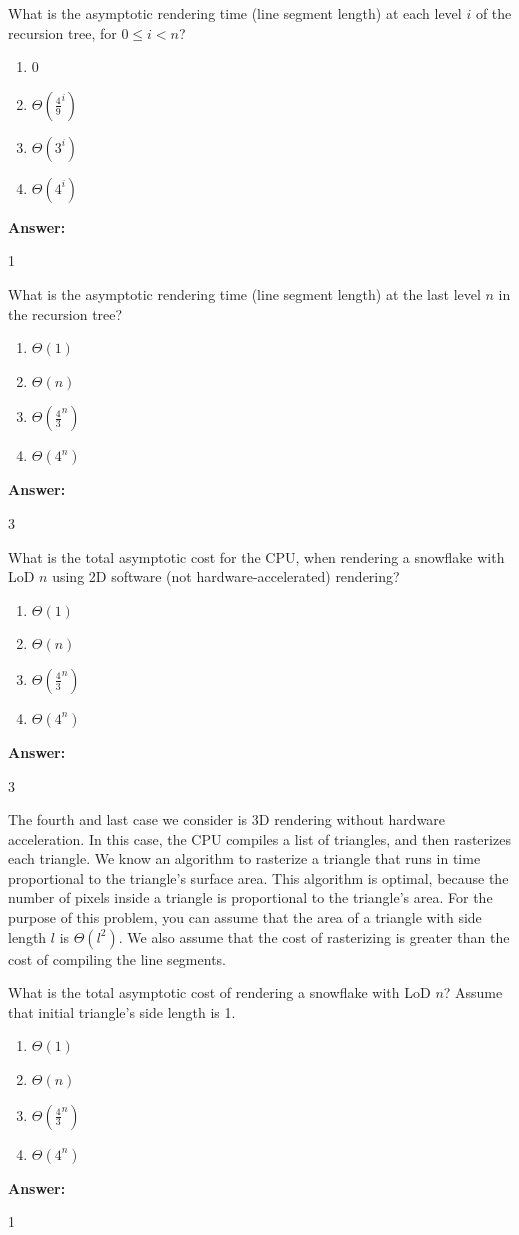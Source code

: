 \documentclass[12pt,twoside]{article}
\newcommand{\answer}{
 \par\medskip
 \textbf{Answer:}
}
\newcommand{\answerIq}{ \answer
1
}
\newcommand{\answerIr}{ \answer
3
}
\newcommand{\answerIs}{ \answer
3
}
\newcommand{\answerIt}{ \answer
1
}
\begin{document}
\begin{problems}
\begin{problemparts}
  \problempart {} What is the asymptotic rendering time (line segment length)
  at each level $i$ of the recursion tree, for $0 \le i < n$?
    \begin{enumerate}
      \item 0
      \item $\Theta(\frac{4}{9} ^ i)$
      \item $\Theta(3 ^ i)$
      \item $\Theta(4 ^ i)$
    \end{enumerate}
\answerIq

  \problempart {} What is the asymptotic rendering time (line segment length)
  at the last level $n$ in the recursion tree?
    \begin{enumerate}
      \item $\Theta(1)$
      \item $\Theta(n)$
      \item $\Theta(\frac{4}{3}^n)$
      \item $\Theta(4^n)$
    \end{enumerate}
\answerIr

  \problempart {} What is the total asymptotic cost for the CPU, when rendering
  a snowflake with LoD $n$ using 2D software (not hardware-accelerated)
  rendering?
   \begin{enumerate}
      \item $\Theta(1)$
      \item $\Theta(n)$
      \item $\Theta(\frac{4}{3}^n)$
      \item $\Theta(4^n)$
    \end{enumerate}
\answerIs

\end{problemparts}

The fourth and last case we consider is 3D rendering without hardware
acceleration. In this case, the CPU compiles a list of triangles, and then
rasterizes each triangle. We know an algorithm to rasterize a triangle that
runs in time proportional to the triangle's surface area. This algorithm is
optimal, because the number of pixels inside a triangle is proportional to the
triangle's area. For the purpose of this problem, you can assume that the area
of a triangle with side length $l$ is $\Theta(l^2)$. We also assume that the
cost of rasterizing is greater than the cost of compiling the line segments.

\begin{problemparts}
  \problempart {} What is the total asymptotic cost of rendering a snowflake
  with LoD $n$? Assume that initial triangle's side length is 1.
    \begin{enumerate}
      \item $\Theta(1)$
      \item $\Theta(n)$
      \item $\Theta(\frac{4}{3}^n)$
      \item $\Theta(4^n)$
    \end{enumerate}
\answerIt
    

\end{problemparts}
\end{problems}
\end{document}
